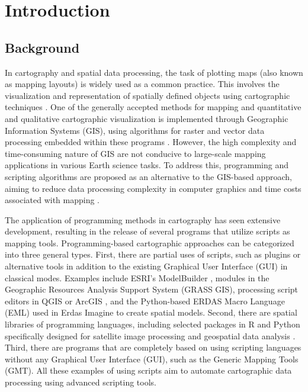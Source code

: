 \documentclass[geomatics,article,accept,pdftex,moreauthors]{Definitions/mdpi}
\begin{document}
\section{Introduction}

\subsection{Background}
In cartography and spatial data processing, the task of plotting maps (also known as mapping layouts) is widely used as a common practice. This involves the visualization and representation of spatially defined objects using cartographic techniques \cite{PAPPVARY1989103,ROBINSON198991,GOODCHILD20091}. One of the generally accepted methods for mapping and quantitative and qualitative cartographic visualization is implemented through Geographic Information Systems (GIS), using algorithms for raster and vector data processing embedded within these programs \cite{GOODCHILD2009500,SLOCUM1991167,TAYLOR1994333}. However, the high complexity and time-consuming nature of GIS are not conducive to large-scale mapping applications in various Earth science tasks. To address this, programming and scripting algorithms are proposed as an alternative to the GIS-based approach, aiming to reduce data processing complexity in computer graphics and time costs associated with mapping \cite{10162166}. %

The application of programming methods in cartography has seen extensive development, resulting in the release of several programs that utilize scripts as mapping tools. Programming-based cartographic approaches can be categorized into three general types. First, there are partial uses of scripts, such as plugins or alternative tools in addition to the existing Graphical User Interface (GUI) in classical modes. Examples include ESRI's ModelBuilder \cite{6344536}, modules in the Geographic Resources Analysis Support System (GRASS GIS), processing script editors in QGIS or ArcGIS \cite{OMRAN2016140,NAGHIBI2021101232}, and the Python-based ERDAS Macro Language (EML) used in Erdas Imagine to create spatial models. Second, there are spatial libraries of programming languages, including selected packages in R and Python specifically designed for satellite image processing and geospatial data analysis \cite{ROBERTS2022105192,jimaging8120317,VOS2019104528,app122412554}. Third, there are programs that are completely based on using scripting languages without any Graphical User Interface (GUI), such as the Generic Mapping Tools (GMT). All these examples of using scripts aim to automate cartographic data processing using advanced scripting tools.
\end{document}
